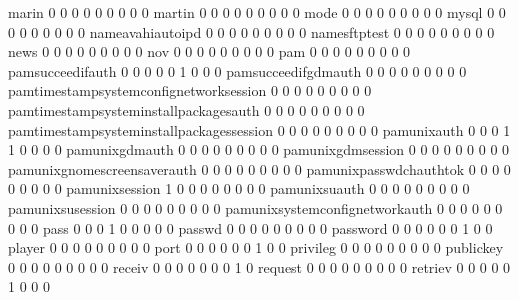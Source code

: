 \documentclass[compress,8pt]{beamer}
\begin{document}
\begin{frame}
\begin{Schunk}
  marin                                      0   0   0   0   0   0   0   0   0
  martin                                     0   0   0   0   0   0   0   0   0
  mode                                       0   0   0   0   0   0   0   0   0
  mysql                                      0   0   0   0   0   0   0   0   0
  nameavahiautoipd                           0   0   0   0   0   0   0   0   0
  namesftptest                               0   0   0   0   0   0   0   0   0
  news                                       0   0   0   0   0   0   0   0   0
  nov                                        0   0   0   0   0   0   0   0   0
  pam                                        0   0   0   0   0   0   0   0   0
  pamsucceedifauth                           0   0   0   0   0   1   0   0   0
  pamsucceedifgdmauth                        0   0   0   0   0   0   0   0   0
  pamtimestampsystemconfignetworksession     0   0   0   0   0   0   0   0   0
  pamtimestampsysteminstallpackagesauth      0   0   0   0   0   0   0   0   0
  pamtimestampsysteminstallpackagessession   0   0   0   0   0   0   0   0   0
  pamunixauth                                0   0   0   1   1   0   0   0   0
  pamunixgdmauth                             0   0   0   0   0   0   0   0   0
  pamunixgdmsession                          0   0   0   0   0   0   0   0   0
  pamunixgnomescreensaverauth                0   0   0   0   0   0   0   0   0
  pamunixpasswdchauthtok                     0   0   0   0   0   0   0   0   0
  pamunixsession                             1   0   0   0   0   0   0   0   0
  pamunixsuauth                              0   0   0   0   0   0   0   0   0
  pamunixsusession                           0   0   0   0   0   0   0   0   0
  pamunixsystemconfignetworkauth             0   0   0   0   0   0   0   0   0
  pass                                       0   0   0   1   0   0   0   0   0
  passwd                                     0   0   0   0   0   0   0   0   0
  password                                   0   0   0   0   0   0   1   0   0
  player                                     0   0   0   0   0   0   0   0   0
  port                                       0   0   0   0   0   0   1   0   0
  privileg                                   0   0   0   0   0   0   0   0   0
  publickey                                  0   0   0   0   0   0   0   0   0
  receiv                                     0   0   0   0   0   0   0   1   0
  request                                    0   0   0   0   0   0   0   0   0
  retriev                                    0   0   0   0   0   1   0   0   0

\end{Schunk}
\end{frame}
\end{document}
